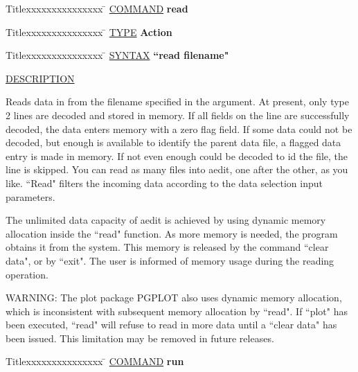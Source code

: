 \begin{tabbing}
Titlexxxxxxxxxxxxxxx \= \kill
\underline{COMMAND} \> {\bf 	read} \\
\end{tabbing}

\begin{tabbing}
Titlexxxxxxxxxxxxxxx \= \kill
\underline{TYPE} \> {\bf 		Action} \\
\end{tabbing}

\begin{tabbing}
Titlexxxxxxxxxxxxxxx \= \kill
\underline{SYNTAX} \> {\bf 		``read filename"} \\
\end{tabbing}

\underline{DESCRIPTION}
\begin{list}{}{\setlength{\leftmargin}{0.5in}
     \setlength{\rightmargin}{0in}}
\item
Reads data in from the filename specified in the argument.
At present, only type 2 lines are decoded and stored in 
memory.  If all fields on the line are successfully decoded, 
the data enters memory with a zero flag field.  If some data 
could not be decoded, but enough is available to identify 
the parent data file, a flagged data entry is made in memory.  
If not even enough could be decoded to id the file, the line 
is skipped.  You can read as many files into aedit, one after 
the other, as you like.  ``Read" filters the incoming data 
according to the data selection input parameters.
\item
The unlimited data capacity of aedit is achieved by using
dynamic memory allocation inside the ``read" function.  As
more memory is needed, the program obtains it from the system.
This memory is released by the command ``clear data", or
by ``exit".  The user is informed of memory usage during the
reading operation.
\item
WARNING: The plot package PGPLOT also uses dynamic memory
allocation, which is inconsistent with subsequent memory
allocation by ``read".  If ``plot" has been executed, ``read"
will refuse to read in more data until a ``clear data" has
been issued.  This limitation may be removed in future
releases.
\end{list}
\vspace{.2in}

\begin{tabbing}
Titlexxxxxxxxxxxxxxx \= \kill
\underline{COMMAND} \> {\bf 	run} \\
\end{tabbing}

